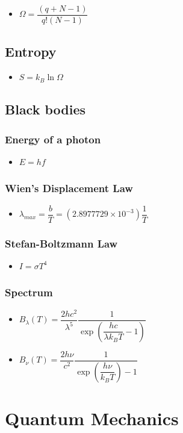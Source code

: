 \documentclass[]{report}
\newcommand \tab[1][1cm]{\hspace*{#1}}
\newcommand{\itemt}{\item \tab}
\begin{document}
\begin{itemize}
\itemt \( \Omega = \dfrac{(q+N-1)}{q!(N-1)} \)
\end{itemize}

\subsection{Entropy}

\begin{itemize}
\itemt \( S = k_B \ln \Omega \)
\end{itemize}


\subsection{Black bodies}

\subsubsection{Energy of a photon}
\begin{itemize}
\itemt \( E = hf \)
\end{itemize}

\subsubsection{Wien's Displacement Law}
\begin{itemize}
\itemt \( \lambda_{max} = \dfrac{b}{T} = (2.8977729\times10^{-3}) \dfrac{1}{T} \)
\end{itemize}

\subsubsection{Stefan-Boltzmann Law}
\begin{itemize}
\itemt \( I = \sigma T^4 \)
\end{itemize}

\subsubsection{Spectrum}
\begin{itemize}
\itemt \( B_\lambda (T) = \dfrac{2 h c^2}{\lambda^5} \dfrac{1}{\exp(\dfrac{h c}{\lambda k_B T} - 1)} \)
\itemt \( B_\nu (T) = \dfrac{2 h \nu}{c^2} \dfrac{1}{\exp(\dfrac{h \nu}{k_B T}) - 1} \)
\end{itemize}

	\section{Quantum Mechanics}	
\end{document}
